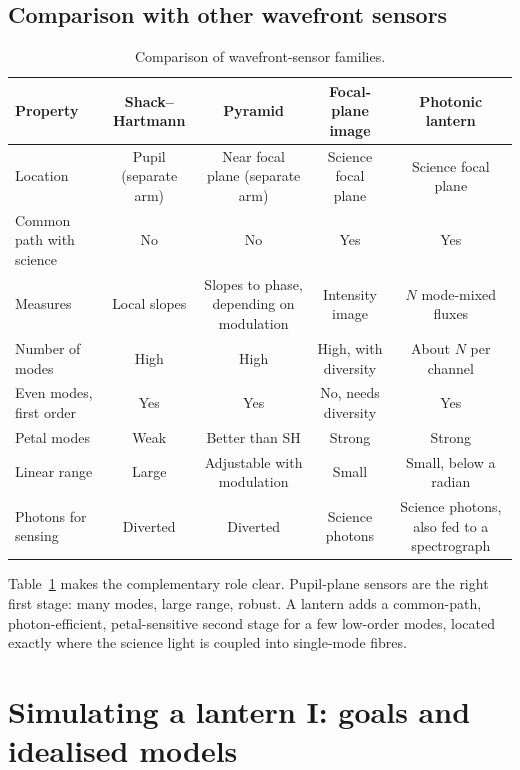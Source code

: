 \documentclass[11pt,a4paper]{article}
\begin{document}
\subsection{Comparison with other wavefront sensors}
\begin{table}[h]
\centering
\caption{Comparison of wavefront-sensor families.}
\label{tab:compare}
\small
\begin{tabular}{@{}lcccc@{}}
\toprule
Property & Shack--Hartmann & Pyramid & Focal-plane image & Photonic lantern \\
\midrule
Location & Pupil (separate arm) & Near focal plane (separate arm) & Science focal plane & Science focal plane \\
Common path with science & No & No & Yes & Yes \\
Measures & Local slopes & Slopes to phase, depending on modulation & Intensity image & $N$ mode-mixed fluxes \\
Number of modes & High & High & High, with diversity & About $N$ per channel \\
Even modes, first order & Yes & Yes & No, needs diversity & Yes \\
Petal modes & Weak & Better than SH & Strong & Strong \\
Linear range & Large & Adjustable with modulation & Small & Small, below a radian \\
Photons for sensing & Diverted & Diverted & Science photons & Science photons, also fed to a spectrograph \\
\bottomrule
\end{tabular}
\end{table}
Table~\ref{tab:compare} makes the complementary role clear. Pupil-plane sensors are the right first stage: many modes, large range, robust. A lantern adds a common-path, photon-efficient, petal-sensitive second stage for a few low-order modes, located exactly where the science light is coupled into single-mode fibres.

\section{Simulating a lantern I: goals and idealised models}
\end{document}
